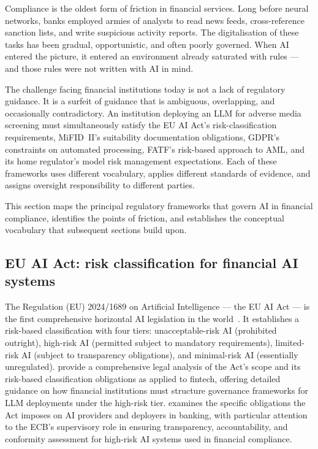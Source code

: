 \begin{context}
Compliance is the oldest form of friction in financial services. Long before neural networks, banks employed armies of analysts to read news feeds, cross-reference sanction lists, and write suspicious activity reports. The digitalisation of these tasks has been gradual, opportunistic, and often poorly governed. When AI entered the picture, it entered an environment already saturated with rules --- and those rules were not written with AI in mind.

The challenge facing financial institutions today is not a lack of regulatory guidance. It is a surfeit of guidance that is ambiguous, overlapping, and occasionally contradictory. An institution deploying an LLM for adverse media screening must simultaneously satisfy the EU AI Act's risk-classification requirements, MiFID~II's suitability documentation obligations, GDPR's constraints on automated processing, FATF's risk-based approach to AML, and its home regulator's model risk management expectations. Each of these frameworks uses different vocabulary, applies different standards of evidence, and assigns oversight responsibility to different parties.

This section maps the principal regulatory frameworks that govern AI in financial compliance, identifies the points of friction, and establishes the conceptual vocabulary that subsequent sections build upon.
\end{context}

\subsection{EU AI Act: risk classification for financial AI systems}
\label{sec:ch11-eu-ai-act}

The Regulation (EU) 2024/1689 on Artificial Intelligence --- the EU AI Act --- is the first comprehensive horizontal AI legislation in the world~\cite{euaiact2024}. It establishes a risk-based classification with four tiers: unacceptable-risk AI (prohibited outright), high-risk AI (permitted subject to mandatory requirements), limited-risk AI (subject to transparency obligations), and minimal-risk AI (essentially unregulated). \citet{AndhovAmparo2024} provide a comprehensive legal analysis of the Act's scope and its risk-based classification obligations as applied to fintech, offering detailed guidance on how financial institutions must structure governance frameworks for LLM deployments under the high-risk tier. \citet{Passador2024} examines the specific obligations the Act imposes on AI providers and deployers in banking, with particular attention to the ECB's supervisory role in ensuring transparency, accountability, and conformity assessment for high-risk AI systems used in financial compliance.

